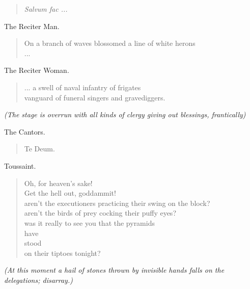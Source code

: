 \documentclass[letterpaper,article,12pt,oneside,notitlepage]{memoir}
\begin{document}
\begin{verse}
\textit{Salvum fac ...} \\
\end{verse}

\begin{center}The Reciter Man.\end{center}

\begin{verse}
On a branch of waves blossomed a line of white herons \\
... \\
\end{verse}

\begin{center}The Reciter Woman.\end{center}

\begin{verse}
... a swell of naval infantry of frigates \\
vanguard of funeral singers and gravediggers. \\
\end{verse}

\textit{(The stage is overrun with all kinds of clergy giving out blessings, frantically)}

\begin{center}The Cantors.\end{center}

\begin{verse}
Te Deum. \\
\end{verse}

\begin{center}Toussaint.\end{center}

\begin{verse}
Oh, for heaven's sake! \\
Get the hell out, goddammit! \\
aren't the executioners practicing their swing on the block? \\
aren't the birds of prey cocking their puffy eyes? \\
was it really to see you that the pyramids \\
have \\
stood \\
on their tiptoes tonight? \\
\end{verse}

\textit{(At this moment a hail of stones thrown by invisible hands falls on the delegations; disarray.)}
\end{document}
